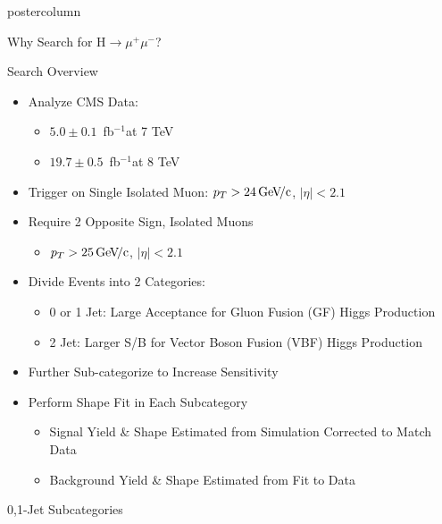\documentclass[final,hyperref={pdfpagelabels=false}]{beamer}
\newcommand{\fb}{\,fb$^{-1}$}
\newcommand{\pt}{\ensuremath{p_T}}
\newcommand{\hmm}{\ensuremath{\mathrm{H} \rightarrow \mu^+\mu^-}}
\newcommand{\GeVc}{\,\text{Ge\kern -0.1em V\!/c}}
\begin{document}
\begin{frame}
\begin{columns}
\begin{column}{.49\textwidth}
\begin{beamercolorbox}[center,wd=\textwidth]{postercolumn}
\begin{minipage}[T]{.95\textwidth}
{\begin{block}{Why Search for \hmm{}?}
\begin{itemize}
{\begin{itemize}
                \end{itemize}              
                }
              \end{itemize}
            \end{block}
            \vfill
            \begin{block}{Search Overview}
              \begin{itemize}
                \item Analyze CMS Data:
                \begin{itemize}
                  \item $5.0 \pm 0.1$ \fb at 7 TeV
                  \item $19.7 \pm 0.5$ \fb at 8 TeV
                \end{itemize}              
                \item Trigger on Single Isolated Muon: $\pt>24\GeVc{}$, $|\eta|<2.1$
                \item Require 2 Opposite Sign, Isolated Muons
                \begin{itemize}
                  \item $\pt>25\GeVc{}$, $|\eta|<2.1$
                \end{itemize}              
                \item Divide Events into 2 Categories:
                \begin{itemize}
                  \item 0 or 1 Jet:  Large Acceptance for Gluon Fusion (GF) Higgs Production
                  \item 2 Jet:  Larger S/B for Vector Boson Fusion (VBF) Higgs Production
                \end{itemize}              
                \item Further Sub-categorize to Increase Sensitivity
                \item Perform Shape Fit in Each Subcategory
                \begin{itemize}
                  \item Signal Yield \& Shape Estimated from Simulation Corrected to Match Data
                  \item Background Yield \& Shape Estimated from Fit to Data
                \end{itemize}              
              \end{itemize}
            \end{block}
            \vfill
            \begin{block}{0,1-Jet Subcategories}

\end{block}}
\end{minipage}
\end{beamercolorbox}
\end{column}
\end{columns}
\end{frame}
\end{document}
